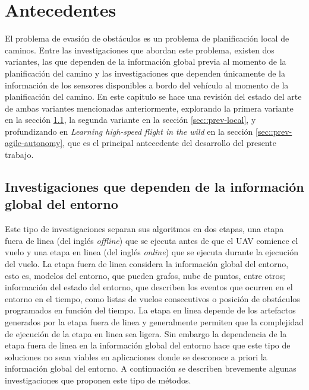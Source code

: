 \chapter{Antecedentes}
\label{capitulo4}


El problema de evasión de obstáculos es un problema de planificación local de caminos. Entre las investigaciones que abordan este problema, existen dos variantes, las que dependen de la información global previa al momento de la planificación del camino y las investigaciones que dependen únicamente de la información de los sensores disponibles a bordo del vehículo al momento de la planificación del camino. En este capitulo se hace una revisión del estado del arte de ambas variantes mencionadas anteriormente, explorando la primera variante en la sección \ref{sec::prev-global}, la segunda variante en la sección \ref{sec::prev-local}, y profundizando en \textit{Learning high-speed flight in the wild} en la sección \ref{sec::prev-agile-autonomy}, que es el principal antecedente del desarrollo del presente trabajo.

\section{Investigaciones que dependen de la información global del entorno}
\label{sec::prev-global}

Este tipo de investigaciones separan sus algoritmos en dos etapas, una etapa fuera de linea (del inglés \textit{offline}) que se ejecuta antes de que el UAV comience el vuelo y una etapa en linea (del inglés \textit{online}) que se ejecuta durante la ejecución del vuelo. La etapa fuera de linea considera la información global del entorno, esto es, modelos del entorno, que pueden grafos, nube de puntos, entre otros; información del estado del entorno, que describen los eventos que ocurren en el entorno en el tiempo, como listas de vuelos consecutivos o posición de obstáculos programados en función del tiempo. La etapa en linea depende de los artefactos generados por la etapa fuera de linea y generalmente permiten que la complejidad de ejecución de la etapa en linea sea ligera. Sin embargo la dependencia de la etapa fuera de linea en la información global del entorno hace que este tipo de soluciones no sean viables en aplicaciones donde se desconoce a priori la información global del entorno. A continuación se describen brevemente algunas investigaciones que proponen este tipo de métodos.

